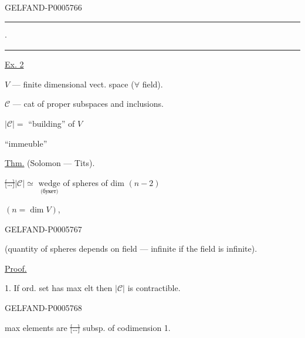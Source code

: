 \begin{GelfandAdjacentEvidence}{GELFAND-P000576}{6}


\noindent\hfill\rule{1.18cm}{.32pt}\enspace\(\cdot\)\enspace\rule{1.22cm}{.32pt}\par

\underline{Ex. 2}

\(V\) — finite dimensional vect. space (\(\forall\) field).

\(\mathcal C\) — cat of proper subspaces and inclusions.

\(\lvert\mathcal C\rvert=\) “building” of \(V\)
\hfill{}

\hspace{5em}“immeuble”

\underline{Thm.} (Solomon — Tits).

\sout{[\ldots]}\quad \(\lvert\mathcal C\rvert\simeq\)
\(\underset{\text{(букет)}}{\text{wedge}}\)
of spheres of dim \((n-2)\)

\hfill\((n=\dim V)\),
\end{GelfandAdjacentEvidence}
\begin{GelfandAdjacentEvidence}{GELFAND-P000576}{7}


(quantity of spheres depends on field — infinite if the field is infinite).

\underline{Proof.}

1. If ord. set has max elt then \(\lvert\mathcal C\rvert\) is contractible.
\end{GelfandAdjacentEvidence}
\begin{GelfandAdjacentEvidence}{GELFAND-P000576}{8}


max elements are \sout{[\ldots]} subsp. of codimension 1.
\end{GelfandAdjacentEvidence}
